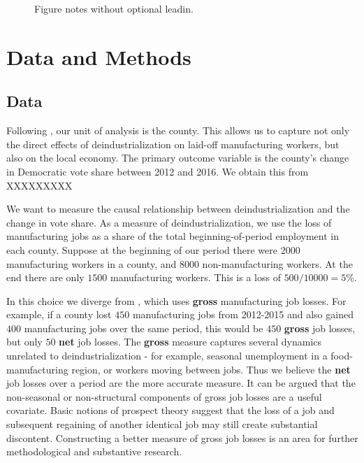 \documentclass[]{AEA}
\begin{document}
\begin{figure} \label{vShapePlot}
\caption{}

\begin{figurenotes}
Figure notes without optional leadin.
\end{figurenotes}
\end{figure}

\section{Data and Methods} 
\label{datamethods}

\subsection{Data} 
\label{datasec}

Following \cite{Baccini21}, our unit of analysis is the county. This
allows us to capture not only the direct effects of deindustrialization
on laid-off manufacturing workers, but also on the local economy. The
primary outcome variable is the county's change in Democratic vote share
between 2012 and 2016. We obtain this from XXXXXXXXX

We want to measure the causal relationship between deindustrialization
and the change in vote share. As a measure of deindustrialization, we
use the loss of manufacturing jobs as a share of the total
beginning-of-period employment in each county. Suppose at the beginning
of our period there were \(2000\) manufacturing workers in a county, and
\(8000\) non-manufacturing workers. At the end there are only \(1500\)
manufacturing workers. This is a loss of \(500/10000 = 5\%.\)

In this choice we diverge from \cite{Baccini21}, which uses
\textbf{gross} manufacturing job losses. For example, if a county lost
\(450\) manufacturing jobs from 2012-2015 and also gained \(400\)
manufacturing jobs over the same period, this would be \(450\)
\textbf{gross} job losses, but only \(50\) \textbf{net} job losses. The
\textbf{gross} measure captures several dynamics unrelated to
deindustrialization - for example, seasonal unemployment in a
food-manufacturing region, or workers moving between jobs. Thus we
believe the \textbf{net} job losses over a period are the more accurate
measure. It can be argued that the non-seasonal or non-structural
components of gross job losses are a useful covariate. Basic notions of
prospect theory suggest that the loss of a job and subsequent regaining
of another identical job may still create substantial discontent.
Constructing a better measure of gross job losses is an area for further
methodological and substantive research.
\end{document}
